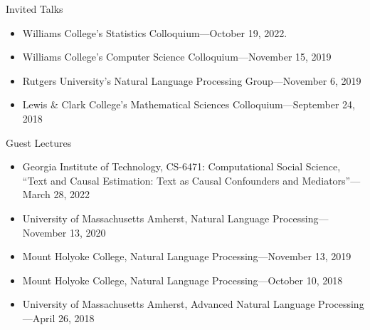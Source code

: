\documentclass{resume} %
\begin{document}

\begin{rSection}{Invited Talks}

\begin{itemize}
\item Williams College's Statistics Colloquium---October 19, 2022.
\item Williams College's Computer Science Colloquium---November 15, 2019
\item Rutgers University's Natural Language Processing Group---November 6, 2019
\item Lewis \& Clark College's Mathematical Sciences Colloquium---September 24, 2018
\end{itemize}

\end{rSection}


\begin{rSection}{Guest Lectures}

\begin{itemize}
\item Georgia Institute of Technology, CS-6471: Computational Social Science, ``Text and Causal Estimation: Text as Causal Confounders and Mediators''---March 28, 2022
\item University of Massachusetts Amherst, Natural Language Processing---November 13, 2020 
\item Mount Holyoke College, Natural Language Processing---November 13, 2019
\item Mount Holyoke College, Natural Language Processing---October 10, 2018
\item University of Massachusetts Amherst, Advanced Natural Language Processing---April 26, 2018
\end{itemize}

\end{rSection}

\end{document}
